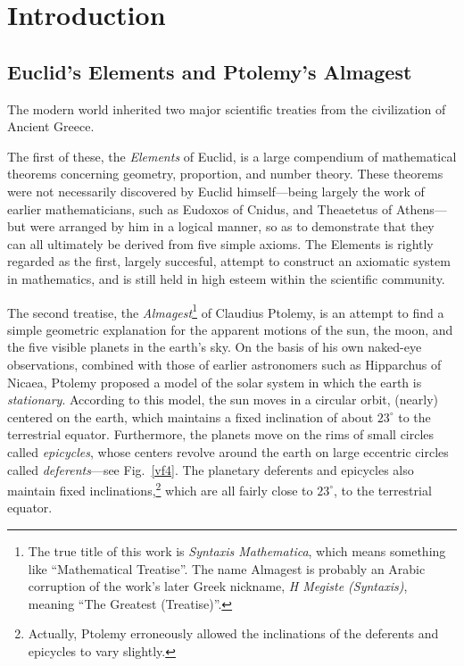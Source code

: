 \chapter{Introduction} 
\section{Euclid's Elements and Ptolemy's Almagest}
The modern world inherited two major scientific treaties from the civilization
of Ancient Greece. 

The first of these, the {\em Elements}\/ of Euclid, is a
large compendium of mathematical theorems concerning geometry, proportion, and number
theory. These theorems were not necessarily discovered by Euclid
himself---being largely the work of earlier mathematicians,
such as Eudoxos of Cnidus, and Theaetetus of Athens---but were arranged
by him in a logical manner, so as to demonstrate that they can all ultimately
be derived from five simple axioms. The Elements is rightly regarded
as the first, largely succesful, attempt to construct an
axiomatic system in mathematics, and is still held in high esteem within
the scientific community.

The second treatise, the {\em Almagest}\footnote{The true title
of this work is {\em Syntaxis Mathematica}, which means something
like ``Mathematical Treatise''. The name Almagest is probably an
Arabic corruption of the work's later Greek nickname, {\em H Megiste
(Syntaxis)}, meaning ``The Greatest (Treatise)''.} of Claudius Ptolemy, 
is an attempt to find a simple geometric explanation for the apparent motions of the sun,
the moon, and the five visible planets in the earth's sky.  On the basis of his own naked-eye observations, combined with those of earlier astronomers such as Hipparchus of Nicaea, Ptolemy proposed  a model of the solar system in which the earth is {\em stationary}.
According to this model, the sun moves in a circular orbit, (nearly) centered on the earth, which 
maintains a fixed inclination of about $23^\circ$ to the  terrestrial equator.
Furthermore, the planets move  on the rims of small
circles called {\em epicycles}, whose centers revolve around the earth
on large eccentric circles called {\em deferents}---see Fig.~\ref{vf4}. The
planetary deferents and epicycles also
maintain fixed inclinations,\footnote{Actually, Ptolemy erroneously allowed the inclinations of the
deferents and epicycles to vary slightly.} which are all fairly close to $23^\circ$,
to the  terrestrial equator. 

